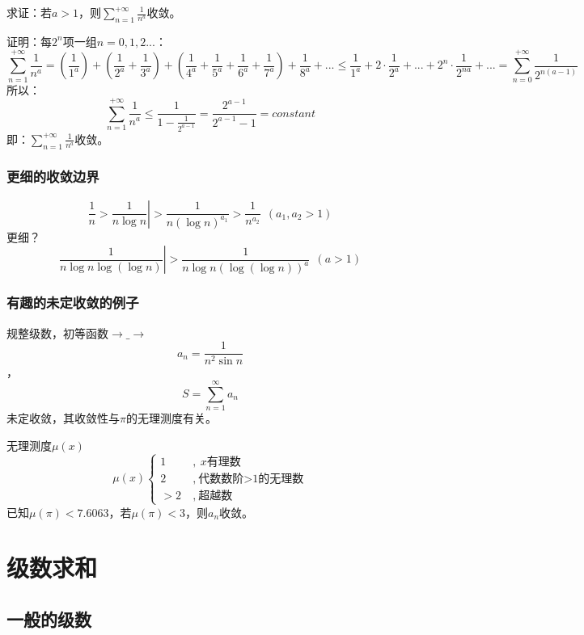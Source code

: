 求证：若$a>1$，则$\sum_{n=1}^{+\infty}\frac{1}{n^a}$收敛。

证明：每$2^n$项一组$n=0,1,2...$：
\[\sum_{n=1}^{+\infty}\frac{1}{n^a} = \left(\frac{1}{1^a}\right)+\left(\frac{1}{2^a}+\frac{1}{3^a}\right)+\left(\frac{1}{4^a}+\frac{1}{5^a}+\frac{1}{6^a}+\frac{1}{7^a}\right)+\frac{1}{8^a}+... \le \frac{1}{1^a}+2\cdot\frac{1}{2^a}+...+2^n\cdot\frac{1}{2^{na}}+... = \sum_{n=0}^{+\infty} \frac{1}{2^{n(a-1)}}\]
所以：
\[\sum_{n=1}^{+\infty}\frac{1}{n^a} \le \frac{1}{1-\frac{1}{2^{a-1}}} = \frac{2^{a-1}}{2^{a-1}-1} = constant\]
即：$\sum_{n=1}^{+\infty}\frac{1}{n^a}$收敛。

\subsubsection{更细的收敛边界}

\begin{equation}
\left.\frac{1}{n} > \frac{1}{n\log n} \right| > \frac{1}{n(\log n)^{a_1}} > \frac{1}{n^{a_2}}  \ \ (a_1,a_2>1)
\end{equation}
更细？
\begin{equation}
\left. \frac{1}{n\log n \log (\log n)} \right| > \frac{1}{n\log n (\log (\log n))^a} \ \ (a>1)
\end{equation}

\subsubsection{有趣的未定收敛的例子}

规整级数，初等函数$\rightarrow \_ \rightarrow$
\[a_n=\frac{1}{n^2 \sin n}\]，\[S=\sum_{n=1}^{\infty}a_n\] 未定收敛，其收敛性与$\pi$的无理测度有关。

无理测度$\mu(x)$
\[\mu(x)\left\{ 
	\begin{array}{ll}
	1  \  &   ,\ x\text{有理数}\\
	2  \  &   ,\ \text{代数数阶>1的无理数}\\
	>2 \  &   ,\ \text{超越数}
	\end{array}
\right.\]
已知$\mu(\pi)<7.6063$，若$\mu(\pi)<3$，则$a_n$收敛。

\section{级数求和}
\label{jsqh}

\subsection{一般的级数}

